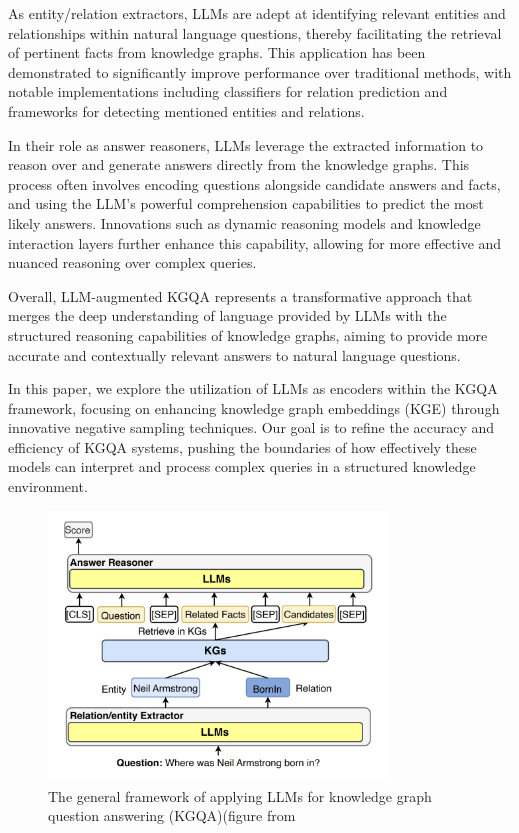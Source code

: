\documentclass{article}
\begin{document}
As entity/relation extractors, LLMs are adept at identifying relevant entities and relationships within natural language questions, thereby facilitating the retrieval of pertinent facts from knowledge graphs. This application has been demonstrated to significantly improve performance over traditional methods, with notable implementations including classifiers for relation prediction and frameworks for detecting mentioned entities and relations.

In their role as answer reasoners, LLMs leverage the extracted information to reason over and generate answers directly from the knowledge graphs. This process often involves encoding questions alongside candidate answers and facts, and using the LLM's powerful comprehension capabilities to predict the most likely answers. Innovations such as dynamic reasoning models and knowledge interaction layers further enhance this capability, allowing for more effective and nuanced reasoning over complex queries.

Overall, LLM-augmented KGQA represents a transformative approach that merges the deep understanding of language provided by LLMs with the structured reasoning capabilities of knowledge graphs, aiming to provide more accurate and contextually relevant answers to natural language questions.

In this paper, we explore the utilization of LLMs as encoders within the KGQA framework, focusing on enhancing knowledge graph embeddings (KGE) through innovative negative sampling techniques. Our goal is to refine the accuracy and efficiency of KGQA systems, pushing the boundaries of how effectively these models can interpret and process complex queries in a structured knowledge environment.

\begin{figure}[!ht] %
  \centering %
  \includegraphics[width=0.8\textwidth]{introduction_img.png} %
  \caption{The general framework of applying LLMs for knowledge graph
question answering (KGQA)(figure from \textcite{Pan2023UnifyingLL}
} %
  \label{fig:introduction_img} %
\end{figure}
\end{document}
